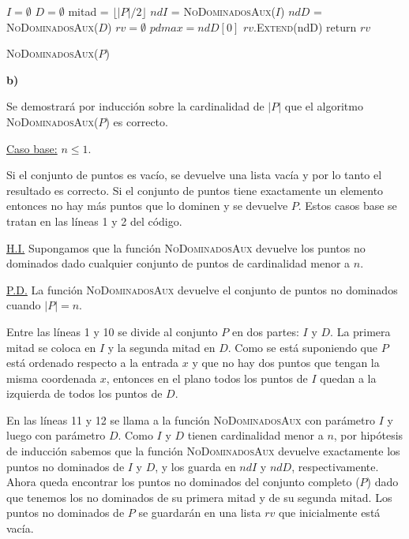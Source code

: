\documentclass{article}
\begin{document}
\begin{algorithm}[htbp]

$I = \emptyset$\;
$D = \emptyset$\;
mitad = $\lfloor |P| / 2 \rfloor$\;
$ndI$ = \textsc{NoDominadosAux($I$)}\;
$ndD$ = \textsc{NoDominadosAux($D$)}\;
$rv = \emptyset$\;
$pdmax = ndD[0]$\;
$rv$.\textsc{Extend}(ndD)\;
return $rv$\;

\caption{\textsc{NoDominadosAux($P$)}}

\end{algorithm}

\textbf{b)}

Se demostrará por inducción sobre la cardinalidad de $|P|$ que el algoritmo \textsc{NoDominadosAux($P$)} es correcto.

\underline{Caso base:} $n \leq 1$.

Si el conjunto de puntos es vacío, se devuelve una lista vacía y por lo tanto el resultado es correcto. Si el conjunto de puntos tiene exactamente un elemento entonces no hay más puntos que lo dominen y se devuelve $P$. Estos casos base se tratan en las líneas 1 y 2 del código.

\underline{H.I.} Supongamos que la función \textsc{NoDominadosAux} devuelve los puntos no dominados dado cualquier conjunto de puntos de cardinalidad menor a $n$. 

\underline{P.D.} La función \textsc{NoDominadosAux} devuelve el conjunto de puntos no dominados cuando $|P| = n$.

Entre las líneas 1 y 10 se divide al conjunto $P$ en dos partes: $I$ y $D$. La primera mitad se coloca en $I$ y la segunda mitad en $D$. Como se está suponiendo que $P$ está ordenado respecto a la entrada $x$ y que no hay dos puntos que tengan la misma coordenada $x$, entonces en el plano todos los puntos de $I$ quedan a la izquierda de todos los puntos de $D$.

En las líneas 11 y 12 se llama a la función \textsc{NoDominadosAux} con parámetro $I$ y luego con parámetro $D$. Como $I$ y $D$ tienen cardinalidad menor a $n$, por hipótesis de inducción sabemos que la función \textsc{NoDominadosAux} devuelve exactamente los puntos no dominados de $I$ y $D$, y los guarda en $ndI$ y $ndD$, respectivamente. Ahora queda encontrar los puntos no dominados del conjunto completo ($P$) dado que tenemos los no dominados de su primera mitad y de su segunda mitad. Los puntos no dominados de $P$ se guardarán en una lista $rv$ que inicialmente está vacía.
\end{document}
